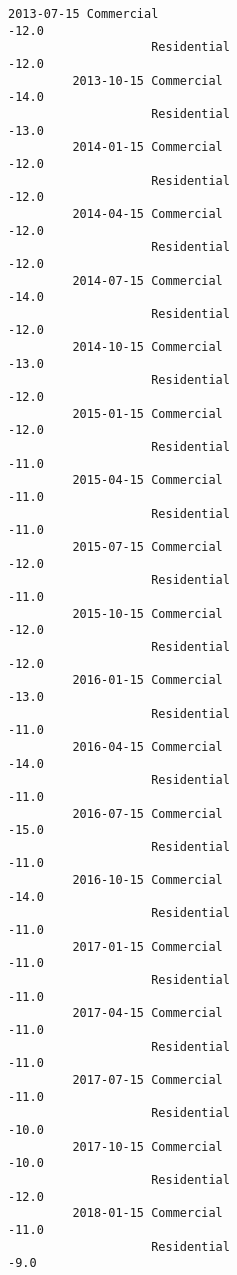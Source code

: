 \documentclass[11pt]{article}
\begin{document}
\begin{Verbatim}[commandchars=\\\{\}]
         2013-07-15 Commercial                                             -12.0   
                    Residential                                            -12.0   
         2013-10-15 Commercial                                             -14.0   
                    Residential                                            -13.0   
         2014-01-15 Commercial                                             -12.0   
                    Residential                                            -12.0   
         2014-04-15 Commercial                                             -12.0   
                    Residential                                            -12.0   
         2014-07-15 Commercial                                             -14.0   
                    Residential                                            -12.0   
         2014-10-15 Commercial                                             -13.0   
                    Residential                                            -12.0   
         2015-01-15 Commercial                                             -12.0   
                    Residential                                            -11.0   
         2015-04-15 Commercial                                             -11.0   
                    Residential                                            -11.0   
         2015-07-15 Commercial                                             -12.0   
                    Residential                                            -11.0   
         2015-10-15 Commercial                                             -12.0   
                    Residential                                            -12.0   
         2016-01-15 Commercial                                             -13.0   
                    Residential                                            -11.0   
         2016-04-15 Commercial                                             -14.0   
                    Residential                                            -11.0   
         2016-07-15 Commercial                                             -15.0   
                    Residential                                            -11.0   
         2016-10-15 Commercial                                             -14.0   
                    Residential                                            -11.0   
         2017-01-15 Commercial                                             -11.0   
                    Residential                                            -11.0   
         2017-04-15 Commercial                                             -11.0   
                    Residential                                            -11.0   
         2017-07-15 Commercial                                             -11.0   
                    Residential                                            -10.0   
         2017-10-15 Commercial                                             -10.0   
                    Residential                                            -12.0   
         2018-01-15 Commercial                                             -11.0   
                    Residential                                             -9.0   
         

\end{Verbatim}
\end{document}
